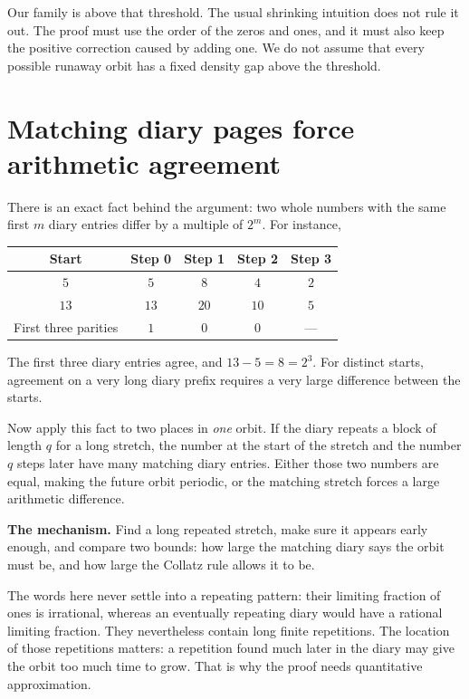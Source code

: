 \documentclass[11pt]{article}
\begin{document}
Our family is above that threshold. The usual shrinking intuition does
not rule it out. The proof must use the order of the zeros and ones,
and it must also keep the positive correction caused by adding one.
We do not assume that every possible runaway orbit has a fixed density
gap above the threshold.

\section{Matching diary pages force arithmetic agreement}
There is an exact fact behind the argument: two whole numbers with the
same first $m$ diary entries differ by a multiple of $2^m$.
For instance,
\begin{center}
\begin{tabular}{c@{\qquad}cccc}
\toprule
Start & Step 0 & Step 1 & Step 2 & Step 3\\
\midrule
$5$ & $5$ & $8$ & $4$ & $2$\\
$13$ & $13$ & $20$ & $10$ & $5$\\
\midrule
First three parities & $1$ & $0$ & $0$ & ---\\
\bottomrule
\end{tabular}
\end{center}
The first three diary entries agree, and $13-5=8=2^3$.
For distinct starts, agreement on a very long diary prefix requires a
very large difference between the starts.

Now apply this fact to two places in \emph{one} orbit. If the diary
repeats a block of length $q$ for a long stretch, the number at the start
of the stretch and the number $q$ steps later have many matching diary
entries. Either those two numbers are equal, making the future orbit
periodic, or the matching stretch forces a large arithmetic difference.

\begin{keyidea}
\textbf{The mechanism.} Find a long repeated stretch, make sure it appears
early enough, and compare two bounds: how large the matching diary says
the orbit must be, and how large the Collatz rule allows it to be.
\end{keyidea}
The words here never settle into a repeating pattern: their limiting
fraction of ones is irrational, whereas an eventually repeating diary
would have a rational limiting fraction. They nevertheless contain
long finite repetitions. The location of those repetitions matters:
a repetition found much later in the diary may give the orbit too much
time to grow. That is why the proof needs quantitative approximation.
\end{document}
